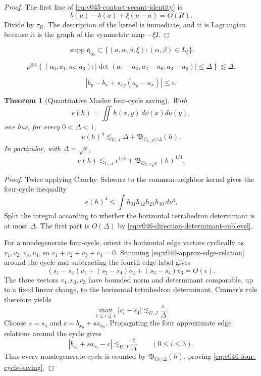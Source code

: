 \documentclass[10pt]{article}
\newtheorem{theorem}{Theorem}[section]
\newcommand{\supp}{\operatorname{supp}}
\begin{document}
\begin{proof}
The first line of \eqref{eq:v045-contact-secant-identity} is
\[
b(u)-b(a)+\xi(u-a)=O(R).
\]
Divide by \(\tau_R\).  The description of the kernel is immediate, and it is Lagrangian because
it is the graph of the symmetric map \(-\xi I\).
\end{proof}

\begin{equation}
\label{eq:v046-limit-maslov-support}
\boxed{
\supp\mathfrak q_\infty
\subset
\{(a,\alpha,\beta,\xi):
(\alpha,\beta)\in L_\xi\}.
}
\end{equation}

\begin{equation}
\label{eq:v046-direction-determinant-sublevel}
\boxed{
\rho^{\otimes4}
\left\{
(a_0,a_1,a_2,a_3):
\left|
\det(a_1-a_0,a_2-a_0,a_3-a_0)
\right|
\le\Delta
\right\}
\lesssim \Delta.
}
\end{equation}

\begin{equation}
\label{eq:v046-approx-edge-relation}
|b_y-b_x+s_{xy}(a_y-a_x)|\le\epsilon.
\end{equation}

\begin{theorem}[Quantitative Maslov four-cycle saving]
\label{thm:v046-quantitative-four-cycle}
With
\[
e(h)=\iint h(x,y)\,d\nu(x)d\nu(y),
\]
one has, for every \(0<\Delta<1\),
\begin{equation}
\label{eq:v046-four-cycle-saving}
\boxed{
e(h)^4
\lesssim_{U,J}
\Delta
+
\mathfrak B_{C_{U,J}\epsilon/\Delta}(h).
}
\end{equation}
In particular, with \(\Delta=\sqrt\epsilon\),
\[
e(h)
\lesssim_{U,J}
\epsilon^{1/8}
+
\mathfrak B_{C_{U,J}\sqrt\epsilon}(h)^{1/4}.
\]
\end{theorem}

\begin{proof}
Twice applying Cauchy--Schwarz to the common-neighbor kernel gives the four-cycle inequality
\[
e(h)^4
\le
\int h_{01}h_{12}h_{23}h_{30}\,d\nu^4.
\]
Split the integral according to whether the horizontal tetrahedron determinant is at most
\(\Delta\).  The first part is \(O(\Delta)\) by
\eqref{eq:v046-direction-determinant-sublevel}.

For a nondegenerate four-cycle, orient its horizontal edge vectors cyclically as
\(v_1,v_2,v_3,v_4\), so \(v_1+v_2+v_3+v_4=0\).  Summing
\eqref{eq:v046-approx-edge-relation} around the cycle and subtracting the fourth edge label gives
\[
(s_1-s_4)v_1
+(s_2-s_4)v_2
+(s_3-s_4)v_3
=
O(\epsilon).
\]
The three vectors \(v_1,v_2,v_3\) have bounded norm and determinant comparable, up to a fixed
linear change, to the horizontal tetrahedron determinant.  Cramer's rule therefore yields
\[
\max_{1\le i\le4}|s_i-s_4|
\lesssim_{U,J}
\frac{\epsilon}{\Delta}.
\]
Choose \(s=s_4\) and \(c=b_{x_0}+sa_{x_0}\).  Propagating the four approximate edge relations
around the cycle gives
\[
|b_{x_i}+sa_{x_i}-c|
\lesssim_{U,J}
\frac{\epsilon}{\Delta}
\qquad(0\le i\le3).
\]
Thus every nondegenerate cycle is counted by
\(\mathfrak B_{C\epsilon/\Delta}(h)\), proving
\eqref{eq:v046-four-cycle-saving}.
\end{proof}
\end{document}
